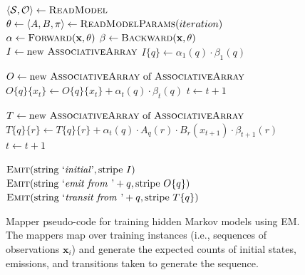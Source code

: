 \begin{figure}[t]
\algrenewcommand{}
\algrenewcommand{}
  \begin{algorithmic}[1]
    \State $\langle \mathcal{S}, \mathcal{O} \rangle \gets \textsc{ReadModel}$
    \State $\theta \gets \langle A , B , \pi \rangle \gets \textsc{ReadModelParams}(iteration)$
    \EndProcedure
        \State $\alpha \gets \textsc{Forward}(\textbf{x},\theta)$ 
        \State $\beta \gets \textsc{Backward}(\textbf{x},\theta)$ 
        \State $I \gets \textrm{new }\textsc{AssociativeArray}$ 
           
          \State $I\{q\} \gets \alpha_1(q) \cdot \beta_1(q)$
        \EndFor
        
        \State $O \gets \textrm{new }\textsc{AssociativeArray}\textrm{ of }\textsc{AssociativeArray}$ 
          
           
           \State $O\{q\}\{x_t\} \gets O\{q\}\{x_t\} + \alpha_t(q) \cdot \beta_t(q)$
        \EndFor
           \State $t \leftarrow t + 1$
        \EndFor

        \State $T \gets \textrm{new }\textsc{AssociativeArray}\textrm{ of }\textsc{AssociativeArray}$
        \State {}
          
           
           
           \State $T\{q\}\{r\} \gets T\{q\}\{r\} + \alpha_t(q) \cdot A_q(r) \cdot B_r(x_{t+1}) \cdot \beta_{t+1}(r)$
        \EndFor
        \EndFor
        \State $t \leftarrow t + 1$
        \EndFor

        \State $\textsc{Emit}(\textrm{string `\emph{initial}'}, \textrm{stripe }I)$
           
           \State $\textsc{Emit}(\textrm{string `\emph{emit from }'}+q, \textrm{stripe }O\{q\})$
           \State $\textsc{Emit}(\textrm{string `\emph{transit from }'}+q, \textrm{stripe }T\{q\})$
        \EndFor

    \EndProcedure
    \EndFunction
  \end{algorithmic}
  \caption{Mapper pseudo-code for training hidden Markov models using EM.  The mappers map over training instances (i.e., sequences of observations $\textbf{x}_i$) and generate the expected counts of initial states, emissions, and transitions taken to generate the sequence.}
\label{figure:chapter6:mr_hmm_mapper}
\end{figure}

